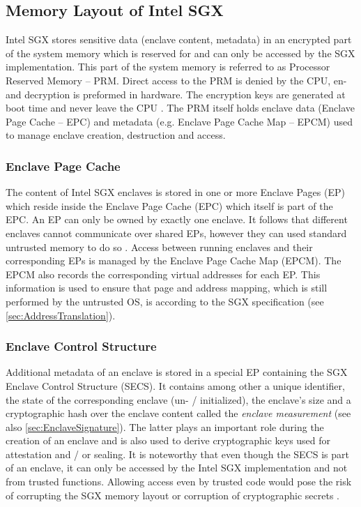 \subsection{Memory Layout of Intel SGX}
Intel SGX stores sensitive data (enclave content, metadata) in an encrypted part of the system memory which is reserved for and can only be accessed by the SGX 
implementation. This part of the system memory is referred to as Processor Reserved Memory -- PRM. Direct access to the PRM is denied by the CPU, en- and decryption 
is preformed in hardware. The encryption keys are generated at boot time and never leave the CPU \cite{IntelSGXExplanation}. The PRM itself holds enclave data (Enclave 
Page Cache -- EPC) and metadata (e.g. Enclave Page Cache Map -- EPCM) used to manage enclave creation, destruction and access.

\subsubsection{Enclave Page Cache}
The content of Intel SGX enclaves is stored in one or more Enclave Pages (EP) which reside inside the Enclave Page Cache (EPC) which itself is part of the EPC. An EP
can only be owned by exactly one enclave. It follows that different enclaves cannot communicate over shared EPs, however they can used standard untrusted memory to
do so \cite{Costan2016IntelSE}. Access between running enclaves and their corresponding EPs is managed by the Enclave Page Cache Map (EPCM). The EPCM also records
the corresponding virtual addresses for each EP. This information is used to ensure that page and address mapping, which is still performed by the untrusted OS, 
is according to the SGX specification (see \cref{sec:AddressTranslation}). 

\subsubsection{Enclave Control Structure}
Additional metadata of an enclave is stored in a special EP containing the SGX Enclave Control Structure (SECS). It contains among other a unique identifier, the
state of the corresponding enclave (un- / initialized), the enclave's size and a cryptographic hash over the enclave content called the \textit{enclave measurement} (see
also \cref{sec:EnclaveSignature}). The latter plays an important role during the creation of an enclave and is also used to derive cryptographic keys used for attestation 
and / or sealing. It is noteworthy that even though the SECS is part of an enclave, it can only be accessed by the Intel SGX implementation and not from trusted functions. 
Allowing access even by trusted code would pose the risk of corrupting the SGX memory layout or corruption of cryptographic secrets \cite{Costan2016IntelSE}.

